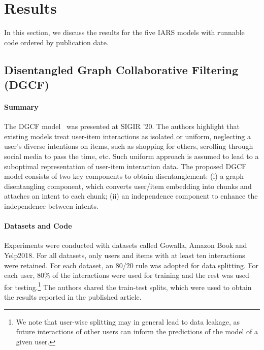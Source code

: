 \documentclass[sigconf,natbib=true,nonacm]{acmart}
\begin{document}
\section{Results}
\label{sec:results}
In this section, we discuss the results for the five IARS models with runnable code ordered by publication date.

\subsection{Disentangled Graph Collaborative Filtering (DGCF)}
\label{sec:DCCF}
\paragraph{Summary} The DGCF model~\cite{wang2020disentangled} was presented at SIGIR '20. The authors highlight that existing models treat user-item interactions as isolated or uniform, neglecting a user's diverse intentions on items, such as shopping for others, scrolling through social media to pass the time, etc. Such uniform approach is assumed to lead to a suboptimal representation of user-item interaction data. The proposed DGCF model consists of two key components to obtain disentanglement: (i) a graph disentangling component, which converts user/item embedding into chunks and attaches an intent to each chunk; (ii) an independence component to enhance the independence between intents.

\paragraph{Datasets and Code}
Experiments were conducted with datasets called Gowalla, Amazon Book and Yelp2018. For all datasets, only users and items with at least ten interactions were retained. For each dataset, an 80/20 rule was adopted for data splitting. For each user, 80\% of the interactions were used for training and the rest was used for testing.\footnote{We note that user-wise splitting may in general lead to data leakage, as future interactions of other users can inform the predictions of the model of a given user.}
The authors shared the train-test splits, which were used to obtain the results reported in the published article.
\end{document}
